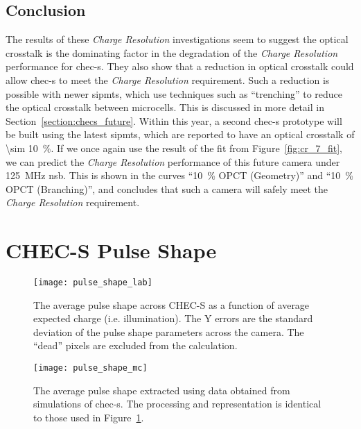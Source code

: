 \subsection{Conclusion}

The results of these \textit{Charge Resolution} investigations seem to suggest the optical crosstalk is the dominating factor in the degradation of the \textit{Charge Resolution} performance for \gls{chec-s}. They also show that a reduction in optical crosstalk could allow \gls{chec-s} to meet the \textit{Charge Resolution} requirement. Such a reduction is possible with newer \glspl{sipmt}, which use techniques such as ``trenching'' to reduce the optical crosstalk between microcells. This is discussed in more detail in Section~\ref{section:checs_future}. Within this year, a second \gls{chec-s} prototype will be built using the latest \glspl{sipmt}, which are reported to have an optical crosstalk of \SI{\sim 10}{\percent}. If we once again use the result of the fit from Figure~\ref{fig:cr_7_fit}, we can predict the \textit{Charge Resolution} performance of this future camera under \SI{125}{MHz} \gls{nsb}. This is shown in the curves ``\SI{10}{\percent} OPCT (Geometry)'' and ``\SI{10}{\percent} OPCT (Branching)'', and concludes that such a camera will safely meet the \textit{Charge Resolution} requirement.

\section{CHEC-S Pulse Shape} \label{section:pulse_shape_results}

\begin{figure}
	\centering
    \texttt{[image: pulse\_shape\_lab]} 
	\caption[Pulse shape versus average expected charge for CHEC-S.]{The average pulse shape across CHEC-S as a function of average expected charge (i.e. illumination). The Y errors are the standard deviation of the pulse shape parameters across the camera. The ``dead'' pixels are excluded from the calculation.}
	\label{fig:pulse_shape_lab}
\end{figure}

\begin{figure}
	\centering
    \texttt{[image: pulse\_shape\_mc]} 
	\caption[Pulse shape versus average expected charge for a CHEC-S simulation.]{The average pulse shape extracted using data obtained from simulations of \gls{chec-s}. The processing and representation is identical to those used in Figure~\ref{fig:pulse_shape_lab}.}
	\label{fig:pulse_shape_mc}
\end{figure}

